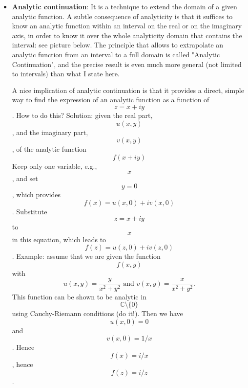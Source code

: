 \begin{itemize}
\item \textbf{Analytic continuation}: It is a technique to extend the domain of a given analytic function. A subtle consequence of analyticity is that it suffices to know an analytic function within an interval on the real or on the imaginary axis, in order to know it over the whole analyticity domain that contains the interval: see picture below. The principle that allows to extrapolate an analytic function from an interval to a full domain is called "Analytic Continuation", and the precise result is even much more general (not limited to intervals) than what I state here.


A nice implication of analytic continuation is that it provides a direct, simple way to find the expression of an analytic function as a function of $$z=x+iy$$. How to do this? Solution: given the real part, $$u(x,y)$$, and the imaginary part, $$v(x,y)$$, of the analytic function $$f(x+iy)$$
Keep only one variable, e.g., $$x$$, and set $$y=0$$, which provides $$f(x)=u(x,0)+iv(x,0)$$.
Substitute $$z=x+iy$$ to $$x$$ in this equation, which leads to $$f(z)=u(z,0)+iv(z,0)$$.
Example: assume that we are given the function $$f(x,y)$$ with
$$\displaystyle u(x,y)=\frac{y}{x^2+y^2}\mbox{ and }v(x,y)=\frac{x}{x^2+y^2}.$$
This function can be shown to be analytic in $${\mathbb C}\setminus\{0\}$$ using Cauchy-Riemann conditions (do it!). Then we have $$u(x,0)=0$$ and $$v(x,0)=1/x$$. Hence $$f(x)=i/x$$, hence $$f(z)=i/z$$.
\end{itemize}